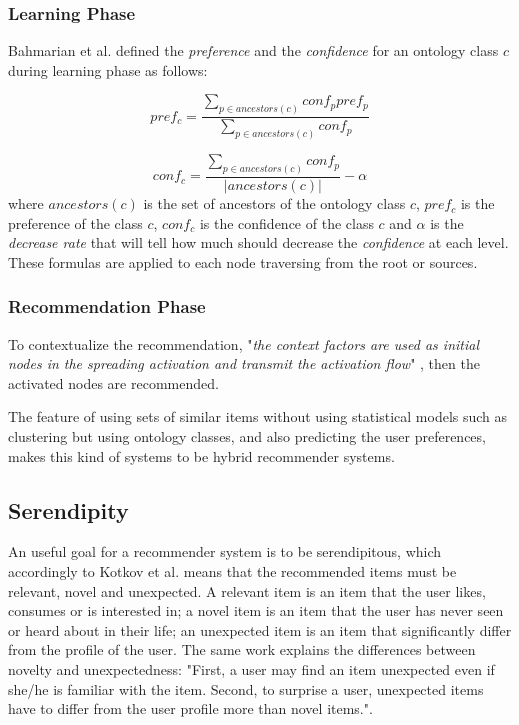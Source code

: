 \subsubsection{Learning Phase}
Bahmarian et al. \cite{bahramian_abbaspour_claramunt_2017} defined the \textit{preference} and the \textit{confidence} for an ontology class $c$ during learning phase as follows:

\begin{equation} \label{eq:preference}
    pref_c = \frac{\displaystyle \sum_{p \in ancestors(c)}{conf_p pref_p}}
                    {\displaystyle  \sum_{p \in ancestors(c)} {conf_p}}
\end{equation}

\begin{equation} \label{eq:confidence}
    conf_c = \frac{\displaystyle \sum_{p \in ancestors(c)} {conf_p}}{|ancestors(c)|} - \alpha
\end{equation}
where $ancestors(c)$ is the set of ancestors of the ontology class $c$, $pref_c$ is the preference of the class $c$, $conf_c$ is the confidence of the class $c$ and $\alpha$ is the \textit{decrease rate} that will tell how much should decrease the \textit{confidence} at each level. These formulas are applied to each node traversing from the root or sources.

\subsubsection{Recommendation Phase}
To contextualize the recommendation, "\textit{the context factors are used as initial nodes in the spreading activation and transmit the activation flow}" \cite{bahramian_abbaspour_claramunt_2017}, then the activated nodes are recommended. 

The feature of using sets of similar items without using statistical models such as clustering but using ontology classes, and also predicting the user preferences, makes this kind of systems to be hybrid recommender systems.

\subsection{Serendipity} \label{section:serendipity}
An useful goal for a recommender system is to be serendipitous, which accordingly to Kotkov et al. \cite{kotkov2016survey} means that the recommended items must be relevant, novel and unexpected. A relevant item is an item that the user likes, consumes or is interested in; a novel item is an item that the user has never seen or heard about in their life; an unexpected item is an item that significantly differ from the profile of the user. The same work explains the differences between novelty and unexpectedness: "First, a user may find an item unexpected even if she/he is familiar with the item. Second, to surprise a user, unexpected items have to differ from the user profile more than novel items.".


